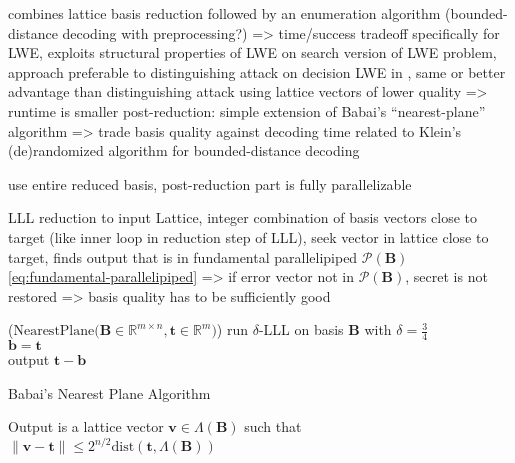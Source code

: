 combines lattice basis reduction followed by an enumeration algorithm (bounded-distance decoding with preprocessing?) => time/success tradeoff
specifically for LWE, exploits structural properties of LWE
on search version of LWE problem, approach preferable to distinguishing attack on decision LWE in \cite{MR09, RS10}, same or better advantage than distinguishing attack using lattice vectors of lower quality => runtime is smaller
post-reduction: simple extension of Babai's ``nearest-plane'' algorithm \cite{Bab85} %
=> trade basis quality against decoding time
related to Klein's (de)randomized algorithm \cite{Kle00} for bounded-distance decoding

use entire reduced basis, post-reduction part is fully parallelizable


LLL reduction to input Lattice, integer combination of basis vectors close to target (like inner loop in reduction step of LLL), seek vector in lattice close to target, finds output that is in fundamental parallelipiped $\mathcal{P}(\mathbf{B})$ \cref{eq:fundamental-parallelipiped} => if error vector not in $\mathcal{P}(\mathbf{B})$, secret is not restored %
=> basis quality has to be sufficiently good
\begin{algorithm2e}
  \Begin($\text{NearestPlane} {(}\mathbf{B} \in \mathbb{R}^{m \times n},\mathbf{t}\in \mathbb{R}^{m}{)}$)
  {
    run $\delta$-LLL on basis $\mathbf{B}$ with $\delta=\frac{3}{4}$\\ %
    $\mathbf{b} = \mathbf{t}$\\
    output $\mathbf{t} - \mathbf{b}$
  }
  \caption{Babai's Nearest Plane Algorithm \cite{Bab85}}\label{alg:babai} %
\end{algorithm2e}

Output is a lattice vector $\mathbf{v} \in \Lambda(\mathbf{B})$ such that $\|\mathbf{v} - \mathbf{t}\| \leq 2^{n/2} \text{dist}(\mathbf{t}, \Lambda(\mathbf{B}))$ %

